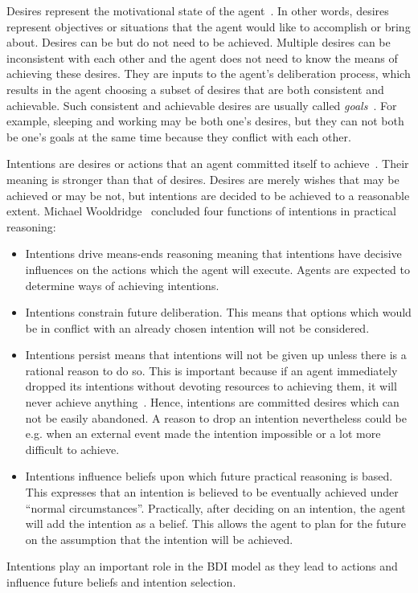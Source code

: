 Desires represent the motivational state of the agent~\cite{Rao_BDITheory_1995}.
In other words, desires represent objectives or situations that the agent would like to accomplish or bring about.
Desires can be but do not need to be achieved.
Multiple desires can be inconsistent with each other and the agent does not need to know the means of achieving these desires.
They are inputs to the agent's deliberation process, which results in the agent choosing a subset of desires that are both consistent and achievable.
Such consistent and achievable desires are usually called \emph{goals}~\cite{Gerhard_MultiSystem_1999}.
For example, sleeping and working may be both one's desires, but they can not both be one's goals at the same time because they conflict with each other.

Intentions are desires or actions that an agent committed itself to achieve~\cite{Alejandro_LearnBDI_2004}.
Their meaning is stronger than that of desires.
Desires are merely wishes that may be achieved or may be not, but intentions are decided to be achieved to a reasonable extent.
Michael Wooldridge~\cite{Gerhard_MultiSystem_1999} concluded four functions of intentions in practical reasoning:
\begin{itemize}
  \item Intentions drive means-ends reasoning meaning that intentions have decisive influences on the actions which the agent will execute.
    Agents are expected to determine ways of achieving intentions.
  \item Intentions constrain future deliberation.
    This means that options which would be in conflict with an already chosen intention will not be considered.
  \item Intentions persist means that intentions will not be given up unless there is a rational reason to do so.
    This is important because if an agent immediately dropped its intentions without devoting resources to achieving them, it will never achieve anything~\cite{Gerhard_MultiSystem_1999}.
    Hence, intentions are committed desires which can not be easily abandoned.
    A reason to drop an intention nevertheless could be e.g. when an external event made the intention impossible or a lot more difficult to achieve.
  \item Intentions influence beliefs upon which future practical reasoning is based.
    This expresses that an intention is believed to be eventually achieved under \enquote{normal circumstances}.
    Practically, after deciding on an intention, the agent will add the intention as a belief.
    This allows the agent to plan for the future on the assumption that the intention will be achieved.
\end{itemize}
Intentions play an important role in the BDI model as they lead to actions and influence future beliefs and intention selection.

